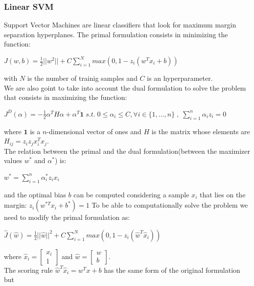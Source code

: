 \documentclass[10pt, a4paper, twocolumn]{article} %
\begin{document}
\subsubsection{Linear SVM}
Support Vector Machines are linear classifiers that look for maximum margin separation hyperplanes.
The primal formulation consists in minimizing the function:
\begin{center}
	\begin{math}
		J(w,b)=\frac{1}{2}||w^2|| + C\sum_{i=1}^{N}max(0, 1-z_i(w^Tx_i+b))
	\end{math}
\end{center}
with $N$ is the number of trainig samples and $C$ is an hyperparameter.\\
We are also goint to take into account the dual formulation to solve the problem that consists in maximizing the function:
\begin{center}
	\begin{math}
		J^D(\alpha)=-\frac{1}{2}\alpha^TH\alpha + \alpha^T\textbf{1} \; s.t.\; 0 \le \alpha_i \le C, \forall i\in \{1,...,n\}\;,\;\sum_{i=1}^{n}\alpha_iz_i=0
	\end{math}
\end{center}
where $\textbf{1}$ is a $n$-dimensional vector of ones and $H$ is the matrix
whose elements are $H_{ij} = z_iz_jx_i^Tx_j$.\\
The relation between the primal and the dual formulation(between the maximizer values $w^*$ and $\alpha^*$) is:
\begin{center}
	$w^*=\sum_{i=1}^{n}\alpha_i^*z_ix_i$
\end{center}
and the optimal bias $b$ can be computed considering a sample $x_i$ that lies on the margin: $z_i(w^{*T}x_i+b^*)=1$
To be able to computationally solve the problem
we need to modify the primal formulation as:
\begin{center}
	\begin{math}
		\hat{J}(\hat{w})=\frac{1}{2}||\hat{w}||^2 + C\sum_{i=1}^{N}max(0, 1-z_i(\hat{w}^T\hat{x}_i))
	\end{math}
\end{center}
where $\hat{x}_i = \begin{bmatrix} x_i\\ 1 \end{bmatrix}$ and $\hat{w} = \begin{bmatrix} w\\ b \end{bmatrix}$.\\
The scoring rule $\hat{w}^T\hat{x}_i = w^Tx + b$ has the same form of the original formulation but
\end{document}
